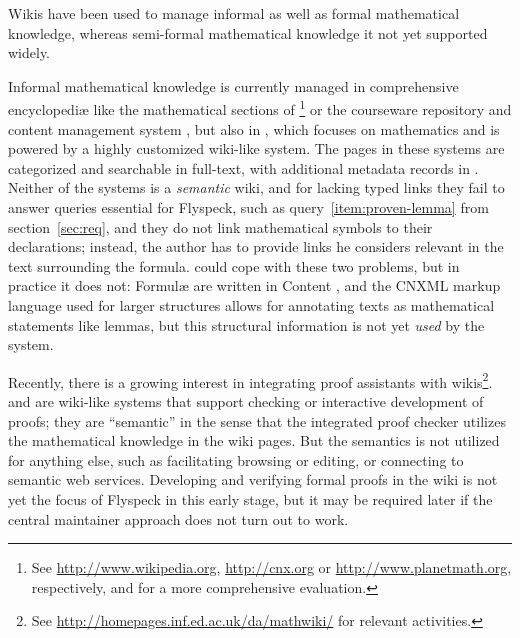Wikis have been used to manage informal as well as formal mathematical knowledge, whereas
semi-formal mathematical knowledge it not yet supported widely.

Informal mathematical knowledge is currently managed in comprehensive encyclopediæ like
the mathematical sections of \footnote{See
  \url{http://www.wikipedia.org}, \url{http://cnx.org} or \url{http://www.planetmath.org},
  respectively, and\cite{Lange:swmkm-tr07} for a more comprehensive evaluation.} or the
courseware repository and content management system
\footnotemark[\value{footnote}], but also in
\footnotemark[\value{footnote}], which focuses on mathematics and is
powered by a highly customized wiki-like system.  The pages in these systems are
categorized and searchable in full-text, with additional metadata records in
.  Neither of the systems is a \emph{semantic} wiki, and for lacking
typed links they fail to answer queries essential for Flyspeck, such as
query~\ref{item:proven-lemma} from section~\ref{sec:req}, and they do not link
mathematical symbols to their declarations; instead, the author has to provide links he
considers relevant in the text surrounding the formula.   could cope
with these two problems, but in practice it does not: Formulæ are written in Content
{\mathml}\cite{CarlisleEd:MathML07}, and the CNXML markup language used for larger
structures allows for annotating texts as mathematical statements like
lemmas\cite{connexions05:cnxml}, but this structural information is not yet \emph{used}
by the system.

Recently, there is a growing interest in integrating proof assistants with
wikis\footnote{See \url{http://homepages.inf.ed.ac.uk/da/mathwiki/} for relevant
  activities.}.   and  are wiki-like systems
that support checking or interactive development of proofs; they are
``semantic'' in the sense that the integrated proof checker utilizes the
mathematical knowledge in the wiki pages.  But the semantics is not utilized for
anything else, such as facilitating browsing or editing, or connecting to
semantic web services.  Developing and verifying formal proofs in the wiki is
not yet the focus of Flyspeck in this early stage, but it may be required later
if the central maintainer approach does not turn out to work.

